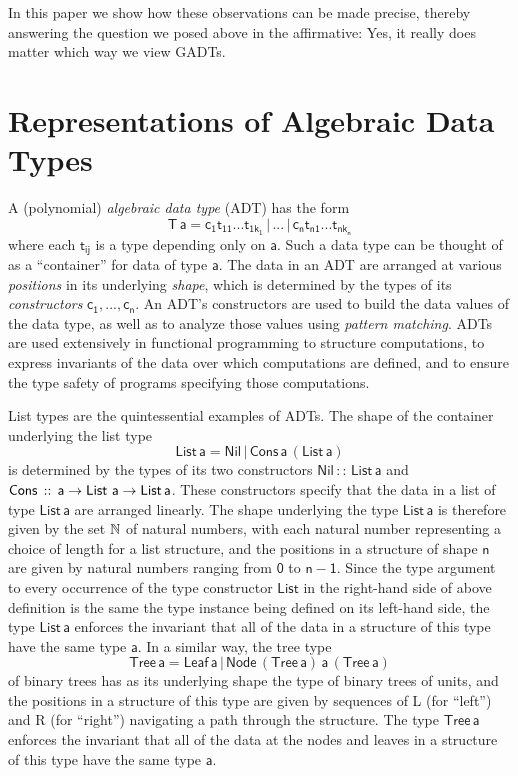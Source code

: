 \documentclass[acmsmall,screen,review,anonymous]{acmart}
\theoremstyle{definition}
\begin{document}
In this paper we show how these observations can be made precise,
thereby answering the question we posed above in the affirmative: Yes,
it really does matter which way we view GADTs.

\section{Representations of Algebraic Data Types}\label{sec:adts}

A (polynomial) {\em algebraic data type} (ADT) has the form
\[\mathsf{T\,a} = \mathsf{c_1 t_{11}}...\mathsf{t_{1k_1}}\, |\, ...\, |\,
\mathsf{c_n t_{n1}}...\mathsf{t_{nk_n}}\] where each $\mathsf{t_{ij}}$
is a type depending only on $\mathsf{a}$. Such a data type can be
thought of as a ``container'' for data of type $\mathsf{a}$. The data
in an ADT are arranged at various {\em positions} in its underlying
{\em shape}, which is determined by the types of its {\em
  constructors} $\mathsf{c_1},...,\mathsf{c_n}$. An ADT's constructors
are used to build the data values of the data type, as well as to
analyze those values using {\em pattern matching}. ADTs are used
extensively in functional programming to structure computations, to
express invariants of the data over which computations are defined,
and to ensure the type safety of programs specifying those
computations.

List types are the quintessential examples of ADTs. The shape of the
container underlying the list type
\[\mathsf{List\,a} = \mathsf{Nil} \,|\, \mathsf{Cons\,a\,(List\,a)}\]
is determined by the types of its two constructors $\mathsf{Nil\, ::\,
  List\, a}$ and $\mathsf{Cons \,::\,a \to \mathsf{List}\,\,a\to
  List\,a}$. These constructors specify that the data in a list of
type $\mathsf{List\,a}$ are arranged linearly. The shape underlying
the type $\mathsf{List\,a}$ is therefore given by the set $\mathbb{N}$ of
natural numbers, with each natural number representing a choice of
length for a list structure, and the positions in a structure of shape
$\mathsf{n}$ are given by natural numbers ranging from $\mathsf{0}$ to
$\mathsf{n-1}$. Since the type argument to every occurrence of the
type constructor $\mathsf{List}$ in the right-hand side of above
definition is the same the type instance being defined on its
left-hand side, the type $\mathsf{List\,a}$ enforces the invariant
that all of the data in a structure of this type have the same type
$\mathsf{a}$. In a similar way, the tree type
\[\mathsf{Tree\, a} = \mathsf{Leaf\,a}
\,|\,\mathsf{Node\,(Tree\,a)\,a\,(Tree\,a)}\] of binary trees has as
its underlying shape the type of binary trees of units, and the
positions in a structure of this type are given by sequences of L (for
``left'') and R (for ``right'') navigating a path through the
structure. The type $\mathsf{Tree\, a}$ enforces the invariant that
all of the data at the nodes and leaves in a structure of this type
have the same type $\mathsf{a}$.
\end{document}
